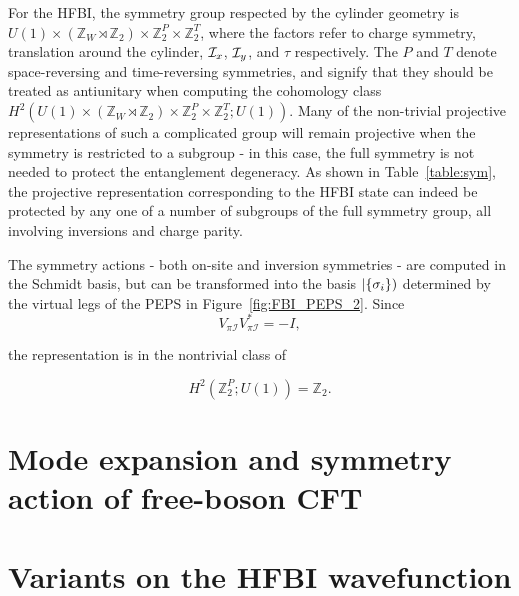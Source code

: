 For the HFBI, the symmetry group respected by the cylinder geometry is
$U(1) \times (\mathbb{Z}_W \rtimes \mathbb{Z}_2)
\times \mathbb{Z}_2^P \times \mathbb{Z}_2^T$, where the factors refer to charge
symmetry, translation around the cylinder, $\mathcal{I}_x$, $\mathcal{I}_y$, and $\tau$ respectively.
The $P$ and $T$ denote space-reversing and time-reversing symmetries, and signify
that they should be treated as antiunitary when computing the cohomology class
$H^2(U(1) \times (\mathbb{Z}_W \rtimes \mathbb{Z}_2)
\times \mathbb{Z}_2^P \times \mathbb{Z}_2^T ; U(1))$. Many of the non-trivial projective
representations of such a complicated group will remain projective when the symmetry is
restricted to a subgroup - in this case, the full symmetry is not needed to protect the 
entanglement degeneracy. As shown in Table~\ref{table:sym}, the projective representation 
corresponding to the HFBI state can indeed be protected by any one of a number of subgroups 
of the full symmetry group, all involving inversions and charge parity.

The symmetry actions - both on-site and inversion symmetries -
are computed in the Schmidt basis, but can be transformed
into the basis $\left |\{\sigma_i\} \right )$ determined by the virtual legs of the PEPS in
Figure~\ref{fig:FBI_PEPS_2}. 
Since
$$
V_{\mathcal{\pi} \mathcal{I}} V_{\mathcal{\pi} \mathcal{I}}^* = -I,
$$

the representation is in the nontrivial class of

$$
H^2(\mathbb{Z}_2^P; U(1)) = \mathbb{Z}_2.
$$


\section{Mode expansion and symmetry action of free-boson CFT}
\label{Appendix:CFT}

\section{Variants on the HFBI wavefunction}
\label{Appendix:Variants}
